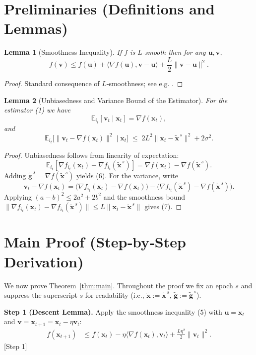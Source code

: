 \documentclass{article}
\newtheorem{lemma}{Lemma}
\newcommand{\EE}{\mathbb{E}}
\begin{document}
\section*{Preliminaries (Definitions and Lemmas)}
\begin{lemma}[Smoothness Inequality]\label{lem:smooth}
If $f$ is $L$‑smooth then for any $\mathbf{u},\mathbf{v}$,
\[
f(\mathbf{v})\le f(\mathbf{u})+\langle\nabla f(\mathbf{u}),\mathbf{v}-\mathbf{u}\rangle+\frac{L}{2}\|\mathbf{v}-\mathbf{u}\|^{2}.
\tag{5}
\]
\end{lemma}
\begin{proof}
Standard consequence of $L$‑smoothness; see e.g. \cite{nesterov2004introductory}. \qedhere
\end{proof}

\begin{lemma}[Unbiasedness and Variance Bound of the Estimator]\label{lem:variance}
For the estimator (1) we have
\[
\EE_{i_t}[\mathbf{v}_t\mid\mathbf{x}_t]=\nabla f(\mathbf{x}_t),
\tag{6}
\]
and
\[
\EE_{i_t}\!\bigl[\|\mathbf{v}_t-\nabla f(\mathbf{x}_t)\|^{2}\mid\mathbf{x}_t\bigr]
\;\le\;2L^{2}\|\mathbf{x}_t-\tilde{\mathbf{x}}^{\,s}\|^{2}+2\sigma^{2}.
\tag{7}
\]
\end{lemma}
\begin{proof}
Unbiasedness follows from linearity of expectation:
\[
\EE_{i_t}[\nabla f_{i_t}(\mathbf{x}_t)-\nabla f_{i_t}(\tilde{\mathbf{x}}^{\,s})]=\nabla f(\mathbf{x}_t)-\nabla f(\tilde{\mathbf{x}}^{\,s}).
\]
Adding $\tilde{\mathbf{g}}^{\,s}=\nabla f(\tilde{\mathbf{x}}^{\,s})$ yields (6).  
For the variance, write
\[
\mathbf{v}_t-\nabla f(\mathbf{x}_t)=\bigl(\nabla f_{i_t}(\mathbf{x}_t)-\nabla f(\mathbf{x}_t)\bigr)-\bigl(\nabla f_{i_t}(\tilde{\mathbf{x}}^{\,s})-\nabla f(\tilde{\mathbf{x}}^{\,s})\bigr).
\]
Applying $(a-b)^{2}\le 2a^{2}+2b^{2}$ and the smoothness bound $\|\nabla f_{i_t}(\mathbf{x}_t)-\nabla f_{i_t}(\tilde{\mathbf{x}}^{\,s})\|\le L\|\mathbf{x}_t-\tilde{\mathbf{x}}^{\,s}\|$ gives (7). \qedhere
\end{proof}

\section*{Main Proof (Step‑by‑Step Derivation)}
We now prove Theorem~\ref{thm:main}. Throughout the proof we fix an epoch $s$ and suppress the superscript $s$ for readability (i.e., $\tilde{\mathbf{x}}:=\tilde{\mathbf{x}}^{\,s}$, $\tilde{\mathbf{g}}:=\tilde{\mathbf{g}}^{\,s}$).

\noindent\textbf{Step 1 (Descent Lemma).}  
Apply the smoothness inequality (5) with $\mathbf{u}=\mathbf{x}_t$ and $\mathbf{v}=\mathbf{x}_{t+1}=\mathbf{x}_t-\eta\mathbf{v}_t$:
\begin{align}
f(\mathbf{x}_{t+1})
&\le f(\mathbf{x}_t)-\eta\langle\nabla f(\mathbf{x}_t),\mathbf{v}_t\rangle+\frac{L\eta^{2}}{2}\|\mathbf{v}_t\|^{2}.
\tag{8}
\end{align}
[Step 1]
\end{document}

